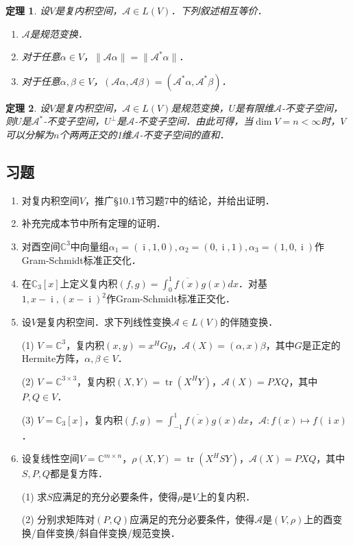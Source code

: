 \documentclass[a4paper,fontset=windows]{ctexbook}
\newtheorem{theorem}{定理}[chapter]
\theoremstyle{definition}
\DeclareMathOperator{\I}{i}
\DeclareMathOperator{\tr}{tr}
\begin{document}
\begin{theorem}
设$V$是复内积空间，$\mathcal{A}\in L(V)$．下列叙述相互等价．
\begin{enumerate}
\item $\mathcal{A}$是规范变换．

\item 对于任意$\alpha\in V$，$\|\mathcal{A}\alpha\|=\|\mathcal{A}^*\alpha\|$．

\item 对于任意$\alpha,\beta\in V$，$(\mathcal{A}\alpha,\mathcal{A}\beta)=(\mathcal{A}^*\alpha,\mathcal{A}^*\beta)$．
\end{enumerate}
\end{theorem}

\begin{theorem}
设$V$是复内积空间，$\mathcal{A}\in L(V)$是规范变换，$U$是有限维$\mathcal{A}$-不变子空间，则$U$是$\mathcal{A}^*$-不变子空间，$U^\perp$是$\mathcal{A}$-不变子空间．由此可得，当$\dim V=n<\infty$时，$V$可以分解为$n$个两两正交的1维$\mathcal{A}$-不变子空间的直和．
\end{theorem}

\subsection*{习题}

\begin{enumerate}
\item 对复内积空间$V$，推广\S 10.1节习题7中的结论，并给出证明．

\item 补充完成本节中所有定理的证明．

\item 对酉空间$\mathbb{C}^3$中向量组$\alpha_1=(\I,1,0),\alpha_2=(0,\I,1),\alpha_3=(1,0,\I)$作Gram-Schmidt标准正交化．

\item 在$\mathbb{C}_3[x]$上定义复内积$(f,g)=\int_0^1\overline{f(x)}g(x)dx$．对基$1,x-\I,(x-\I)^2$作Gram-Schmidt标准正交化．

\item 设$V$是复内积空间．求下列线性变换$\mathcal{A}\in L(V)$的伴随变换．

(1) $V=\mathbb{C}^3$，复内积$(x,y)=x^HGy$，$\mathcal{A}(X)=(\alpha,x)\beta$，其中$G$是正定的Hermite方阵，$\alpha,\beta\in V$．

(2) $V=\mathbb{C}^{3\times 3}$，复内积$(X,Y)=\tr(X^HY)$，$\mathcal{A}(X)=PXQ$，其中$P,Q\in V$．

(3) $V=\mathbb{C}_3[x]$，复内积$(f,g)=\int_{-1}^1\overline{f(x)}g(x)dx$，$\mathcal{A}:f(x)\mapsto f(\I x)$．

\item 设复线性空间$V=\mathbb{C}^{m\times n}$，$\rho(X,Y)=\tr(X^HSY)$，$\mathcal{A}(X)=PXQ$，其中$S,P,Q$都是复方阵．

(1) 求$S$应满足的充分必要条件，使得$\rho$是$V$上的复内积．

(2) 分别求矩阵对$(P,Q)$应满足的充分必要条件，使得$\mathcal{A}$是$(V,\rho)$上的酉变换/自伴变换/斜自伴变换/规范变换．

\end{enumerate}
\end{document}
